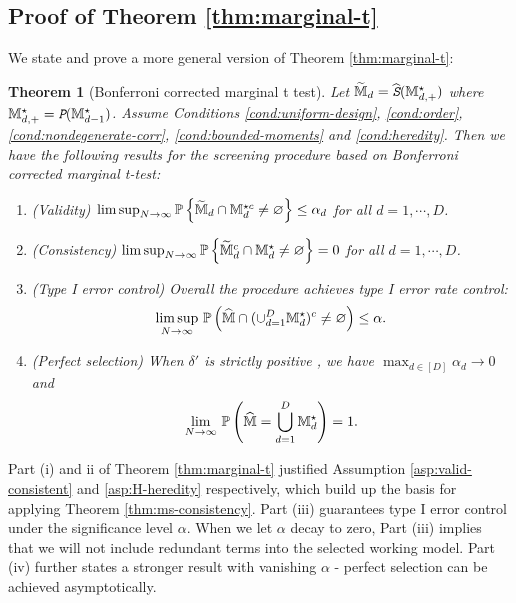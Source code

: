 \documentclass[12pt]{article}
\newtheorem{theorem}{Theorem}
\begin{document}
\subsection{Proof of Theorem \ref{thm:marginal-t}}

We state and prove a more general version of Theorem \ref{thm:marginal-t}:
\begin{theorem}[Bonferroni corrected marginal t test] 
Let $\widetilde{{\mathbb{M}}}_{d} = \widehat{\texttt{\em S}}({\mathbb{M}}^{\star}_{d,+})$ where ${\mathbb{M}}^{\star}_{d,+} = \texttt{\em P}({\mathbb{M}}^{\star}_{d-1})$. Assume Conditions \ref{cond:uniform-design},  \ref{cond:order}, \ref{cond:nondegenerate-corr}, \ref{cond:bounded-moments} and \ref{cond:heredity}. Then we have
the following results for the  screening procedure based on Bonferroni corrected marginal t-test:
\begin{enumerate}[label= (\roman*)]
    \item (Validity) $\lim\sup_{N\to\infty}{\mathbb{P}}\left\{\widetilde{{\mathbb{M}}}_{d}\cap{\mathbb{M}}^{\star c}_d\neq \varnothing\right\}\le \alpha_d$ for all $d=1,\cdots,D$.
    \item (Consistency) $\lim\sup_{N\to\infty}{\mathbb{P}}\left\{\widetilde{{\mathbb{M}}}_{d}^c\cap{\mathbb{M}}^{\star}_d\neq \varnothing\right\} = 0$ for all $d=1,\cdots,D$.
    \item (Type I error control) Overall the procedure achieves type I error rate control:
    \begin{align*}
    \underset{N\to\infty}{\lim\sup}~{\mathbb{P}}\left(\widehat{{\mathbb{M}}}\cap(\cup_{d=1}^D{{\mathbb{M}}_d^\star})^c\neq \varnothing\right)
    \le \alpha.
    \end{align*}
    \item (Perfect selection) When $\delta' $ is strictly positive , we have $\max_{d\in[D]}\alpha_d\to0$ and
    \begin{align*}
    \underset{N\to\infty}{\lim}~{\mathbb{P}}\left(\widehat{{\mathbb{M}}} = \bigcup_{d=1}^D{{\mathbb{M}}_d^\star}  \right)
     = 1.
    \end{align*}
\end{enumerate}

\end{theorem}

Part (i) and {ii} of Theorem \ref{thm:marginal-t} justified Assumption \ref{asp:valid-consistent} and \ref{asp:H-heredity} respectively, which build up the basis for applying Theorem \ref{thm:ms-consistency}. Part (iii) guarantees type I error control under the significance level $\alpha$. When we let $\alpha$ decay to zero, Part (iii) implies that we will not include redundant terms into the selected working model. Part (iv) further states a stronger result with vanishing $\alpha$ - perfect selection can be achieved asymptotically.
\end{document}
